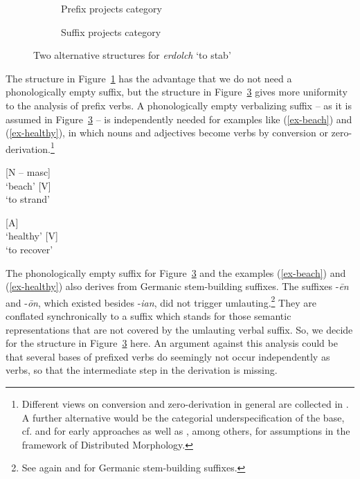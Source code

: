 \documentclass[output=paper
  ,nobabel
  ,draftmode
  ,colorlinks, citecolor=brown
]{langscibook}
\begin{document}
\begin{figure}
\begin{subfigure}[b]{.48\textwidth}
\centering
\scalebox{.92}{
\begin{forest}
	[V
		[V\textsuperscript{af} [er-]]
		[{[N -- masc]} [dolch, name=dolch]]
	]
\end{forest} }
\caption{Prefix projects category}\label{ex-erdolch-a}
\end{subfigure}
\begin{subfigure}[b]{.48\textwidth}
\centering
\scalebox{.92}{
\begin{forest}
	sm edges, empty nodes
	[V
		[[X\textsuperscript{af} [er-]]]
		[V
			[{[N -- masc]} [dolch]]
			[V\textsuperscript{af} [-$\emptyset$, name=empty]]
		]
	]
\end{forest} }
\caption{Suffix projects category}\label{ex-erdolch-b}
\end{subfigure}
\caption{Two alternative structures for \emph{erdolch} `to stab'}
\end{figure}

The structure in Figure~\ref{ex-erdolch-a} has the advantage that we do not need a phonologically empty suffix, but the structure in Figure~\ref{ex-erdolch-b} gives more uniformity to the analysis of prefix verbs. A phonologically empty verbalizing suffix – as it is assumed in Figure~\ref{ex-erdolch-b} – is independently needed for examples like (\ref{ex-beach}) and (\ref{ex-healthy}), in which nouns and adjectives become verbs by conversion or zero-derivation.\footnote{Different views on conversion and zero-derivation in general are collected in \citet{BauerValera2005}. A further alternative would be the categorial underspecification of the base, cf. \citet{Motsch1965} and \citet{BergenholtzMugdan1979} for early approaches as well as \citet{HarleyNoyer1999}, among others, for assumptions in the framework of Distributed Morphology.}

\eal\label{ex-beach}
\ex{} [N – masc]\\`beach'
\ex{} [V]\\`to strand'
\zl

\eal\label{ex-healthy}
\ex{} [A]\\`healthy'
\ex{} [V]\\`to recover'
\zl

\noindent 
The phonologically empty suffix for Figure~\ref{ex-erdolch-b} and the examples (\ref{ex-beach}) and (\ref{ex-healthy}) also derives from Germanic stem-building suffixes. The suffixes -\emph{ēn} and -\emph{ōn}, which existed besides -\emph{ian}, did not trigger umlauting.\footnote{See again \textcites[90--93]{Sonderegger1997}[Section~5.3.7]{Sonderegger2003} and \citet*[217--220]{Schmidt2004} for Germanic stem-building suffixes.} They are conflated synchronically to a suffix which stands for those semantic representations that are not covered by the umlauting verbal suffix. So, we decide for the structure in Figure~\ref{ex-erdolch-b} here. An argument against this analysis could be that several bases of prefixed verbs do seemingly not occur independently as verbs, so that the intermediate step in the derivation is missing.
\end{document}
